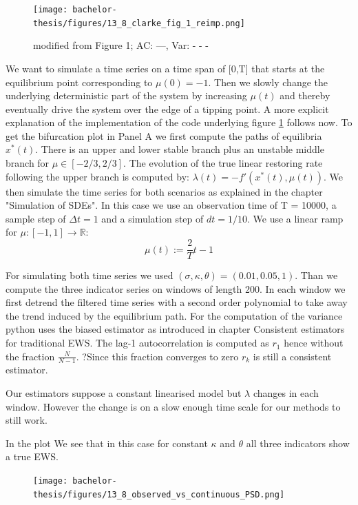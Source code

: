 \documentclass[%
thesis=student,%
coverpage=false,%
titlepage=false,%
headmarks=true, %
german,%
font=libertine, %
math=newpxtx, %
BCOR=5mm,%
coverBCOR=11mm%
]{tumbook}
\begin{document}
\begin{figure}
    \centering
    \texttt{[image: bachelor-thesis/figures/13\_8\_clarke\_fig\_1\_reimp.png]}
    \caption{modified from \cite{Clarke:2023} Figure 1; AC: ---, Var: - - -}
    \label{success_of_trad_ews_and_rosa}
\end{figure}

We want to simulate a time series on a time span of [0,T] that starts at the equilibrium point corresponding to $\mu(0) = -1$. Then we slowly change the underlying deterministic part of the system by increasing $\mu(t)$ and thereby eventually drive the system over the edge of a tipping point. A more explicit explanation of the implementation of the code underlying figure \ref{success_of_trad_ews_and_rosa} follows now. To get the bifurcation plot in Panel A we first compute the paths of equilibria $x^{*}(t)$. There is an upper and lower stable branch plus an unstable middle branch for $\mu \in [-2/3,2/3]$. The evolution of the true linear restoring rate following the upper branch is computed by: $\lambda(t) = -f'(x^{*}(t),\mu(t))$. We then simulate the time series for both scenarios as explained in the chapter "Simulation of SDEs". In this case we use an observation time of T = 10000, a sample step of $\Delta t = 1$ and a simulation step of $dt = 1/10$. We use a linear ramp for $\mu:  [-1,1] \rightarrow \mathbb{R}$:
\[
\mu(t) := \frac{2}{T}t-1
\]

For simulating both time series we used $(\sigma,\kappa,\theta) = (0.01,0.05,1)$. Than we compute the three indicator series on windows of length 200. In each window we first detrend the filtered time series with a second order polynomial to take away the trend induced by the equilibrium path. For the computation of the variance python uses the biased estimator as introduced in chapter Consistent estimators for traditional EWS. The lag-1 autocorrelation is computed as $r_{1}$ hence without the fraction $\frac{N}{N-1}$. ?Since this fraction converges to zero $r_{k}$ is still a consistent estimator.


Our estimators suppose a constant linearised model but $\lambda$ changes in each window. However the change is on a slow enough time scale for our methods to still work.

In the plot We see that in this case for constant $\kappa$ and $\theta$ all three indicators show a true EWS.


\begin{figure}
    \centering
    \texttt{[image: bachelor-thesis/figures/13\_8\_observed\_vs\_continuous\_PSD.png]}
\end{figure}
\end{document}
